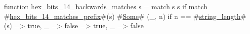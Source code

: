 function hex_bits_14_backwards_matches s = match s {
  s if match #\hyperref[sailRISCVzhexzybitszy14zymatcheszyprefix]{hex\_bits\_14\_matches\_prefix}#(s) {
    #\hyperref[sailRISCVzSome]{Some}# (_, n) if n == #\hyperref[sailRISCVzstringzylength]{string\_length}#(s) => true,
    _ => false
  } => true,
  _ => false
}
